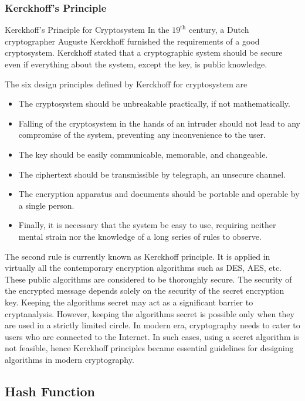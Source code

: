 \documentclass[british]{article}
\begin{document}
\subsubsection{Kerckhoff\textquoteright s Principle}

Kerckhoff's Principle for Cryptosystem In the $19^{\text{th}}$ century,
a Dutch cryptographer Auguste Kerckhoff furnished the requirements
of a good cryptosystem. Kerckhoff stated that a cryptographic system
should be secure even if everything about the system, except the key,
is public knowledge.

The six design principles defined by Kerckhoff for cryptosystem are
\textminus{} 
\begin{itemize}
\item The cryptosystem should be unbreakable practically, if not mathematically. 
\item Falling of the cryptosystem in the hands of an intruder should not
lead to any compromise of the system, preventing any inconvenience
to the user. 
\item The key should be easily communicable, memorable, and changeable. 
\item The ciphertext should be transmissible by telegraph, an unsecure channel. 
\item The encryption apparatus and documents should be portable and operable
by a single person. 
\item Finally, it is necessary that the system be easy to use, requiring
neither mental strain nor the knowledge of a long series of rules
to observe. 
\end{itemize}
The second rule is currently known as Kerckhoff principle. It is applied
in virtually all the contemporary encryption algorithms such as DES,
AES, etc. These public algorithms are considered to be thoroughly
secure. The security of the encrypted message depends solely on the
security of the secret encryption key. Keeping the algorithms secret
may act as a significant barrier to cryptanalysis. However, keeping
the algorithms secret is possible only when they are used in a strictly
limited circle. In modern era, cryptography needs to cater to users
who are connected to the Internet. In such cases, using a secret algorithm
is not feasible, hence Kerckhoff principles became essential guidelines
for designing algorithms in modern cryptography.

\subsection{Hash Function}
\end{document}
